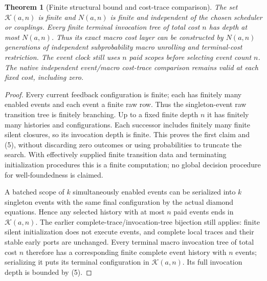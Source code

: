 \documentclass[11pt]{article}
\newtheorem{theorem}{Theorem}\newtheorem{proposition}[theorem]{Proposition}
\begin{document}
\begin{theorem}[Finite structural bound and cost-trace comparison]
The set $\mathcal K(a,n)$ is finite and $N(a,n)$ is finite and independent of the chosen scheduler or couplings. Every finite terminal invocation tree of total cost $n$ has depth at most $N(a,n)$. Thus its exact macro cost layer can be constructed by $N(a,n)$ generations of independent subprobability macro unrolling and terminal-cost restriction. The event clock still uses $n$ paid scopes before selecting event count $n$. The native independent event/macro cost-trace comparison remains valid at each fixed cost, including zero.
\end{theorem}
\begin{proof}
Every current feedback configuration is finite; each has finitely many enabled events and each event a finite raw row. Thus the singleton-event raw transition tree is finitely branching. Up to a fixed finite depth $n$ it has finitely many histories and configurations. Each successor includes finitely many finite silent closures, so its invocation depth is finite. This proves the first claim and (5), without discarding zero outcomes or using probabilities to truncate the search. With effectively supplied finite transition data and terminating initialization procedures this is a finite computation; no global decision procedure for well-foundedness is claimed.

A batched scope of $k$ simultaneously enabled events can be serialized into $k$ singleton events with the same final configuration by the actual diamond equations. Hence any selected history with at most $n$ paid events ends in $\mathcal K(a,n)$. The earlier complete-trace/invocation-tree bijection still applies: finite silent initialization does not execute events, and complete local traces and their stable early ports are unchanged. Every terminal macro invocation tree of total cost $n$ therefore has a corresponding finite complete event history with $n$ events; serializing it puts its terminal configuration in $\mathcal K(a,n)$. Its full invocation depth is bounded by (5).


\end{proof}
\end{document}
